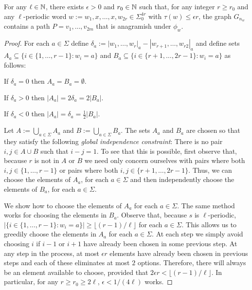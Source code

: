 \documentclass{patmorin}
\begin{document}
\begin{lem}\label{anagramish_path}
    For any $\ell\in\mathbb{N}$, there exists $\epsilon>0$ and $r_0\in\mathbb{N}$ such that, for any integer $r\ge r_0$ and any $\ell$-periodic word $w:=w_1,x,\ldots,x,w_{2r}\in\Sigma_0^{4r}$ with $\tau(w)\le\epsilon r$, the graph $G_{n_w}$ contains a path $P=v_1,\ldots,v_{2m}$ that is anagramish under $\phi_w$.
\end{lem}

\begin{proof}
    For each $a\in\Sigma$ define $\delta_a := |w_1,\ldots,w_r|_{a}-|w_{r+1},\ldots,w_{r2}|_{a}$ and define sets $A_a\subseteq\{i\in \{1,\ldots,r-1\}: w_i=a\}$ and $B_a\subseteq\{i\in\{r+1,\ldots,2r-1\}:w_i=a\}$ as follows:
    \begin{compactenum}
        \item If $\delta_a=0$ then $A_a=B_a=\emptyset$.
        \item If $\delta_a>0$ then $|A_a|=2\delta_a=2|B_a|$.
        \item If $\delta_a<0$ then $|A_a|=\delta_a=\tfrac{1}{2}|B_a|$.
    \end{compactenum}
    Let $A:=\bigcup_{a\in\Sigma} A_a$ and $B:=\bigcup_{a\in\Sigma} B_a$.
    The sets $A_a$ and $B_a$ are chosen so that they satisfy the following \emph{global independence constraint}:  There is no pair $i,j\in A\cup B$ such that $i-j=1$.  To see that this is possible, first observe that, because $r$ is not in $A$ or $B$ we need only concern ourselves with pairs where both $i,j\in\{1,\ldots,r-1\}$ or pairs where both $i,j\in\{r+1,\ldots,2r-1\}$.  Thus, we can choose the elements of $A_a$, for each $a\in\Sigma$ and then independently choose the elements of $B_a$, for each $a\in\Sigma$.

    We show how to choose the elements of $A_a$ for each $a\in\Sigma$.  The same method works for choosing the elements in $B_a$. Observe that, because $s$ is $\ell$-periodic, $|\{i\in \{1,\ldots,r-1\}:w_i=a\}|\ge \lfloor(r-1)/\ell\rfloor$ for each $a\in\Sigma$.  This allows us to greedily choose the elements in $A_a$ for each $a\in\Sigma$. At each step we simply avoid choosing $i$ if $i-1$ or $i+1$ have already been chosen in some previous step.  At any step in the process, at most $\epsilon r$ elements have already been chosen in previous steps and each of these eliminates at most $2$ options.  Therefore, there will always be an element available to choose, provided that $2\epsilon r < \lfloor(r-1)/\ell\rfloor$.  In particular, for any $r\ge r_0\ge 2\ell$, $\epsilon < 1/(4\ell)$ works.


\end{proof}
\end{document}

